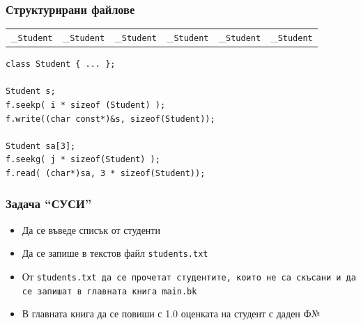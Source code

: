 \documentclass{beamer}
\begin{document}
\begin{frame}[fragile]
  \frametitle{Структурирани файлове}

  \begin{center}
    \newcommand{\yc}{\cellcolor{yellow}\hskip 1ex}
    \newcommand{\gc}{\cellcolor{green}\hskip 1ex}
    \newcommand{\bl}{\multicolumn{4}{c}{\underbrace{\hskip 7ex}_{\tt{Student}}}}
    \begin{tabular}{|c|c|c|c|c|c|c|c|c|c|c|c|c|c|c|c|c|c|c|c|c|c|c|c|}
      \hline
      \yc&\yc&\yc&\yc&\gc&\gc&\gc&\gc&\yc&\yc&\yc&\yc&\gc&\gc&\gc&\gc&\yc&\yc&\yc&\yc&\gc&\gc&\gc&\gc\\
      \hline
      \bl&\bl&\bl&\bl&\bl&\bl
    \end{tabular}
  \end{center}
  \vspace{1em}

\begin{verbatim}
class Student { ... };

Student s;
f.seekp( i * sizeof (Student) );
f.write((char const*)&s, sizeof(Student));

Student sa[3];
f.seekg( j * sizeof(Student) );
f.read( (char*)sa, 3 * sizeof(Student));
\end{verbatim}
\end{frame}

\begin{frame}
  \frametitle{Задача ``СУСИ''}

  \begin{itemize}
  \item Да се въведе списък от студенти
  \item Да се запише в текстов файл \tt{students.txt}
  \item От \tt{students.txt} да се прочетат студентите, които не са скъсани и да се запишат в главната книга \tt{main.bk}
  \item В главната книга да се повиши с 1.0 оценката на студент с даден Ф№
  \end{itemize}
\end{frame}
\end{document}
